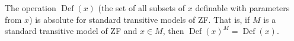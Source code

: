 The operation $\operatorname{Def}(x)$ (the set of all subsets of $x$ definable with parameters from $x$) is absolute for standard transitive models of ZF. That is, if $M$ is a standard transitive model of ZF and $x \in M$, then $\operatorname{Def}(x)^M = \operatorname{Def}(x)$.
